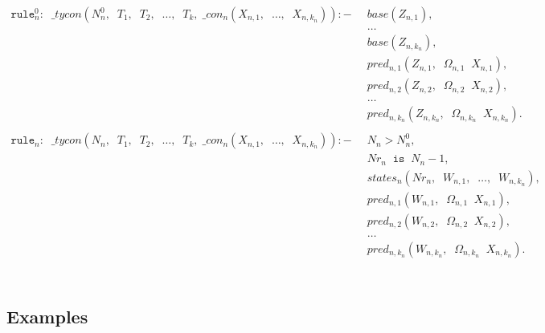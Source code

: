 \documentclass{report}
\theoremstyle{definition}
\theoremstyle{definition}
\newcommand{\ttt}[1]{\texttt{#1}}
\newcommand{\tav}{\;\;}
\begin{document}
	\begin{align*}
		\ttt{rule}_{n}^{0}: \tav \_ tycon (N_{n}^{0}, \tav T_1, \tav T_2, \tav \ldots, \tav T_k, \; \_ con_n(X_{n,1}, \tav \ldots, \tav X_{n,k_n})) :-
		  & \tav base(Z_{n,1}),                                                 &   &   \\
		  & \tav \ldots                                                         &   &   \\
		  & \tav base(Z_{n,k_n}),                                               &   &   \\
		  & \tav pred_{n, 1}(Z_{n,1}, \tav \Omega_{n, 1} \tav X_{n,1}),         &   &   \\
		  & \tav pred_{n, 2}(Z_{n,2}, \tav \Omega_{n, 2} \tav X_{n,2}),         &   &   \\
		  & \tav \ldots \tav                                                    &   &   \\
		  & \tav pred_{n, k_n}(Z_{n,k_n}, \tav \Omega_{n, k_n} \tav X_{n,k_n}). &   &   \\
		\\
		\ttt{rule}_n: \tav \_ tycon (N_n, \tav T_1, \tav T_2, \tav \ldots, \tav T_k, \; \_ con_n(X_{n,1}, \tav \ldots, \tav X_{n,k_n})) :-
		  & \tav N_n > N_{n}^{0},                                               &   &   \\
		  & \tav Nr_n \tav \ttt{is} \tav N_n - 1,                               &   &   \\
		  & \tav states_n(Nr_n, \tav W_{n,1}, \tav \ldots, \tav W_{n,k_n}),     &   &   \\
		  & \tav pred_{n, 1}(W_{n,1}, \tav \Omega_{n, 1} \tav X_{n,1}),         &   &   \\
		  & \tav pred_{n, 2}(W_{n,2}, \tav \Omega_{n, 2} \tav X_{n,2}),         &   &   \\
		  & \tav \ldots \tav                                                    &   &   \\
		  & \tav pred_{n, k_n}(W_{n,k_n}, \tav \Omega_{n, k_n} \tav X_{n,k_n}). &   &   \\
	\end{align*}\\
	\subsection{Examples}
		
\end{document}
